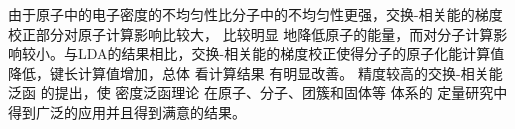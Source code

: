 %
%
%
%

由于原子中的电子密度的不均匀性比分子中的不均匀性更强，交换-相关能的梯度校正部分对原子{计算}影响比较大，%
比较明显%
{地}降低原子的能量，而对分子{计算}影响较小{。}与LDA的结果相比，交换-相关能的梯度校正使得分子的原子化能{计算值}降低，键长{计算值}增加，总体%
{看计算}结果%
有明显改善。%
精度较高的交换-相关能泛函%
的提出，使%
密度泛函理论%
{在}原子、分子、团簇和固体等%
体系的%
{定量研究中得到广泛的应用并且得到满意的结果。}

